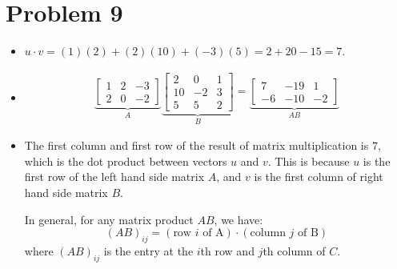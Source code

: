 \documentclass{article}
\newcommand*{\problem}[1]{\section*{Problem #1}}
\begin{document}
\problem{9}
\begin{itemize}
	\item[(a)] $u\cdot v=(1)(2)+(2)(10)+(-3)(5)=2+20-15=\boxed 7$.
	\item[(b)]
		\begin{align*}
			\underbrace{\begin{bmatrix}
				1 & 2 & -3 \\
				2 & 0 & -2
			\end{bmatrix}}_A
			\underbrace{\begin{bmatrix}
				2 & 0 & 1 \\
				10 & -2 & 3 \\
				5 & 5 & 2
			\end{bmatrix}}_B
			=\underbrace{\boxed{\begin{bmatrix}
				7 & -19 & 1 \\
				-6 & -10 & -2
			\end{bmatrix}}}_{AB}
		\end{align*}

	\item[(c)]
		The first column and first row of the result of matrix multiplication is $7$, which is the dot product between vectors $u$ and $v$. This is because $u$ is the first row of the left hand side matrix $A$, and $v$ is the first column of right hand side matrix $B$.

		In general, for any matrix product $AB$, we have:
		\begin{equation*}
			(AB)_{ij}=(\text{row $i$ of A})\cdot (\text{column $j$ of B})
		\end{equation*}
		where $(AB)_{ij}$ is the entry at the $i$th row and $j$th column of $C$.
\end{itemize}
\end{document}

